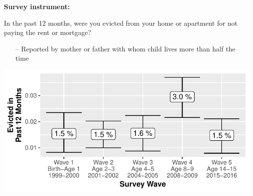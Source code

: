 \documentclass{beamer}
\newcommand\bblue[1]{{\color{blue}\textbf{#1}}}
\begin{document}
\begin{frame}
\bblue{Survey instrument:}
\begin{center}
In the past 12 months, were you evicted from your home or apartment for not paying the rent or mortgage?
\end{center}
\begin{itemize}
\item[--] Reported by mother or father with whom child lives more than half the time
\end{itemize}
\end{frame}

\begin{frame}
\includegraphics[width = \textwidth]{figures/evByWave_weightedOnly}
\end{frame}
\end{document}
